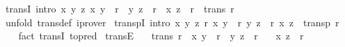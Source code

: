\begin{isabellebody}
\endisatagproof
{\isafoldproof}%
%
\isadelimproof
\isanewline
%
\endisadelimproof
\isanewline
{}\isamarkupfalse%
\ transI\ {\isacharbrackleft}{\kern0pt}intro{\isacharquery}{\kern0pt}{\isacharbrackright}{\kern0pt}{\isacharcolon}{\kern0pt}\ {\isachardoublequoteopen}{\isacharparenleft}{\kern0pt}{\isasymAnd}x\ y\ z{\isachardot}{\kern0pt}\ {\isacharparenleft}{\kern0pt}x{\isacharcomma}{\kern0pt}\ y{\isacharparenright}{\kern0pt}\ {\isasymin}\ r\ {\isasymLongrightarrow}\ {\isacharparenleft}{\kern0pt}y{\isacharcomma}{\kern0pt}\ z{\isacharparenright}{\kern0pt}\ {\isasymin}\ r\ {\isasymLongrightarrow}\ {\isacharparenleft}{\kern0pt}x{\isacharcomma}{\kern0pt}\ z{\isacharparenright}{\kern0pt}\ {\isasymin}\ r{\isacharparenright}{\kern0pt}\ {\isasymLongrightarrow}\ trans\ r{\isachardoublequoteclose}\isanewline
%
\isadelimproof
\ \ %
\endisadelimproof
%
\isatagproof
{}\isamarkupfalse%
\ {\isacharparenleft}{\kern0pt}unfold\ trans{\isacharunderscore}{\kern0pt}def{\isacharparenright}{\kern0pt}\ iprover%
\endisatagproof
{\isafoldproof}%
%
\isadelimproof
\isanewline
%
\endisadelimproof
\isanewline
{}\isamarkupfalse%
\ transpI\ {\isacharbrackleft}{\kern0pt}intro{\isacharquery}{\kern0pt}{\isacharbrackright}{\kern0pt}{\isacharcolon}{\kern0pt}\ {\isachardoublequoteopen}{\isacharparenleft}{\kern0pt}{\isasymAnd}x\ y\ z{\isachardot}{\kern0pt}\ r\ x\ y\ {\isasymLongrightarrow}\ r\ y\ z\ {\isasymLongrightarrow}\ r\ x\ z{\isacharparenright}{\kern0pt}\ {\isasymLongrightarrow}\ transp\ r{\isachardoublequoteclose}\isanewline
%
\isadelimproof
\ \ %
\endisadelimproof
%
\isatagproof
{}\isamarkupfalse%
\ {\isacharparenleft}{\kern0pt}fact\ transI\ {\isacharbrackleft}{\kern0pt}to{\isacharunderscore}{\kern0pt}pred{\isacharbrackright}{\kern0pt}{\isacharparenright}{\kern0pt}%
\endisatagproof
{\isafoldproof}%
%
\isadelimproof
\isanewline
%
\endisadelimproof
\isanewline
{}\isamarkupfalse%
\ transE{\isacharcolon}{\kern0pt}\isanewline
\ \ \ {\isachardoublequoteopen}trans\ r{\isachardoublequoteclose}\ \ {\isachardoublequoteopen}{\isacharparenleft}{\kern0pt}x{\isacharcomma}{\kern0pt}\ y{\isacharparenright}{\kern0pt}\ {\isasymin}\ r{\isachardoublequoteclose}\ \ {\isachardoublequoteopen}{\isacharparenleft}{\kern0pt}y{\isacharcomma}{\kern0pt}\ z{\isacharparenright}{\kern0pt}\ {\isasymin}\ r{\isachardoublequoteclose}\isanewline
\ \ \ {\isachardoublequoteopen}{\isacharparenleft}{\kern0pt}x{\isacharcomma}{\kern0pt}\ z{\isacharparenright}{\kern0pt}\ {\isasymin}\ r{\isachardoublequoteclose}\isanewline

\end{isabellebody}
